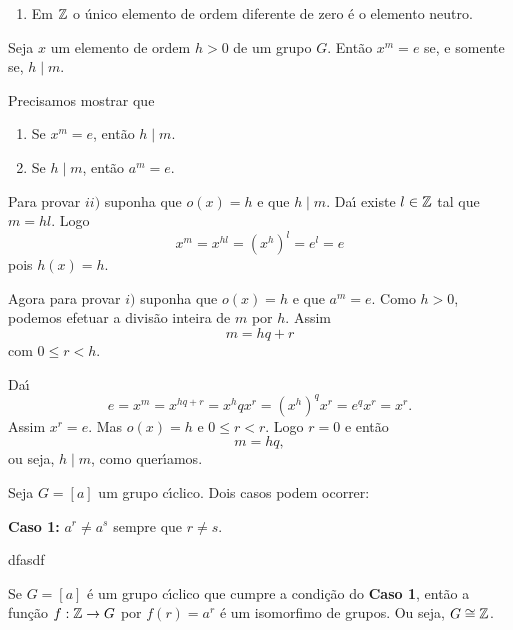 \begin{exemplos}
\begin{enumerate}[label={\arabic*})]
\begin{itemize}
        	De modo semelhante chega-se \`a conclus\~ao que
        	\[
        		o(\overline{2}) = o(\overline{3}) = o(\overline{4}) = 5.
        	\]
        \end{itemize}

        \item Em $\mathbb{Z}$ o \'unico elemento de ordem diferente de zero \'e o elemento neutro.
    \end{enumerate}
\end{exemplos}

\begin{proposicao}
    Seja $x$ um elemento de ordem $h > 0$ de um grupo $G$. Ent\~ao $x^m = e$ se, e somente se, $h \mid m$.
\end{proposicao}
\begin{prova}
	Precisamos mostrar que
	\begin{enumerate}[label={\roman*})]
		\item Se $x^m = e$, ent\~ao $h \mid m$.

		\item Se $h \mid m$, ent\~ao $a^m = e$.
	\end{enumerate}

	Para provar $ii)$ suponha que $o(x) = h$ e que $h \mid m$. Da{\'\i} existe $l \in \mathbb{Z}$ tal que $m = hl$. Logo
	\[
		x^m = x^{hl} = (x^h)^l = e^l = e
	\]
	pois $h(x) = h$.

	Agora para provar $i)$ suponha que $o(x) = h$ e que $a^m = e$. Como $h > 0$, podemos efetuar a divis\~ao inteira de $m$ por $h$. Assim
	\[
		m = hq + r
	\]
	com $0 \le r < h$.

	Da{\'\i}
	\[
		e = x^m = x^{hq + r} = x^hqx^r = (x^h)^qx^r = e^qx^r = x^r.
	\]
	Assim $x^r = e$. Mas $o(x) = h$ e $0 \le r < r$. Logo $r = 0$ e ent\~ao
	\[
		m = hq,
	\]
	ou seja, $h \mid m$, como quer{\'\i}amos.
\end{prova}

Seja $G = [a]$ um grupo c{\'\i}clico. Dois casos podem ocorrer:

\textbf{Caso 1:} $a^r \ne a^s$ sempre que $r \ne s$.
\begin{exemplo}
	dfasdf
\end{exemplo}

\begin{proposicao}
    Se $G = [a]$ \'e um grupo c{\'\i}clico que cumpre a condi\c{c}\~ao do \textbf{Caso 1}, ent\~ao a fun\c{c}\~ao $f : \mathbb{Z} \to G$ por $f(r) = a^r$ \'e um isomorfimo de grupos. Ou seja, $G \cong \mathbb{Z}$.
\end{proposicao}

